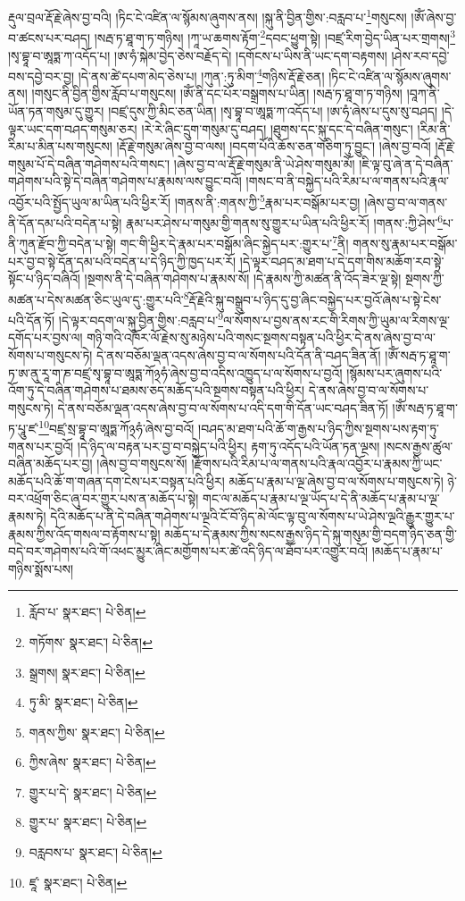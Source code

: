 རྡུལ་བྲལ་རྡོ་རྗེ་ཞེས་བྱ་བའི། །ཏིང་ངེ་འཛིན་ལ་སྙོམས་ཞུགས་ནས། །སྐུ་ནི་བྱིན་གྱིས་:བརླབ་པ་\footnote{རློབ་པ་  སྣར་ཐང་།  པེ་ཅིན། }གསུངས། །ཨོཾ་ཞེས་བྱ་བ་ཚངས་པར་བཤད། །སརྦ་ཏ་ཐཱ་ག་ཏ་གཉིས། །ཀཱ་ཡ་ཆགས་རྟོག་\footnote{གཏོགས་  སྣར་ཐང་།  པེ་ཅིན། }དབང་ཕྱུག་སྟེ། །བཛྲ་རིག་བྱེད་ཡིན་པར་གྲགས།\footnote{སྒྲགས།  སྣར་ཐང་།  པེ་ཅིན། } །སྭ་བྷཱ་བ་ཨཱཏྨ་ཀ་འདོད་པ། །ཨ་ཧཾ་སྐེམ་བྱེད་ཅེས་བརྗོད་དེ། །དགོངས་པ་ཡིས་ནི་ཡང་དག་བརྟགས། །ཤེས་རབ་དབྱེ་བས་དབྱེ་བར་བྱ། །དེ་ནས་ཚེ་དཔག་མེད་ཅེས་པ། །ཀུན་:ཏུ་མིག་\footnote{ཏུ་མི་  སྣར་ཐང་།  པེ་ཅིན། }གཉིས་རྡོ་རྗེ་ཅན། །ཏིང་ངེ་འཛིན་ལ་སྙོམས་ཞུགས་ནས། །གསུང་ནི་བྱིན་གྱིས་རློབ་པ་གསུངས། །ཨོཾ་ནི་དང་པོར་བསྒྲགས་པ་ཡིན། །སརྦ་ཏ་ཐཱ་ག་ཏ་གཉིས། །བཱཀ་ནི་ཡོན་ཏན་གསུམ་དུ་གྱུར། །བཛྲ་དུས་ཀྱི་མིང་ཅན་ཡིན། །སྭ་བྷཱ་བ་ཨཱཏྨ་ཀ་འདོད་པ། །ཨ་ཧཾ་ཞེས་པ་དུས་སུ་བཤད། །དེ་ལྟར་ཡང་དག་བཤད་གསུམ་ཅར། །རེ་རེ་ཞིང་དྲུག་གསུམ་དུ་བཤད། །ཐུགས་དང་སྐུ་དང་དེ་བཞིན་གསུང་། །རིམ་ནི་རིམ་པ་མིན་པས་གསུངས། །རྡོ་རྗེ་གསུམ་ཞེས་བྱ་བ་ལས། །བདག་པོའི་ཆོས་ཅན་གཅིག་ཏུ་བྱུང་། །ཞེས་བྱ་བའོ། །རྡོ་རྗེ་གསུམ་པོ་དེ་བཞིན་གཤེགས་པའི་གསང་། །ཞེས་བྱ་བ་ལ་རྡོ་རྗེ་གསུམ་ནི་ཡེ་ཤེས་གསུམ་མོ། །ཇི་ལྟ་བུ་ཞེ་ན་དེ་བཞིན་གཤེགས་པའི་སྟེ་དེ་བཞིན་གཤེགས་པ་རྣམས་ལས་བྱུང་བའོ། །གསང་བ་ནི་བསྐྱེད་པའི་རིམ་པ་ལ་གནས་པའི་རྣལ་འབྱོར་པའི་སྤྱོད་ཡུལ་མ་ཡིན་པའི་ཕྱིར་རོ། །གནས་ནི་:གནས་ཀྱི་\footnote{གནས་ཀྱིས་  སྣར་ཐང་།  པེ་ཅིན། }རྣམ་པར་བསྒོམ་པར་བྱ། །ཞེས་བྱ་བ་ལ་གནས་ནི་དོན་དམ་པའི་བདེན་པ་སྟེ། རྣམ་པར་ཤེས་པ་གསུམ་གྱི་གནས་སུ་གྱུར་པ་ཡིན་པའི་ཕྱིར་རོ། །གནས་:ཀྱི་ཤེས་\footnote{ཀྱིས་ཞེས་  སྣར་ཐང་།  པེ་ཅིན། }པ་ནི་ཀུན་རྫོབ་ཀྱི་བདེན་པ་སྟེ། གང་གི་ཕྱིར་དེ་རྣམ་པར་བསྒོམ་ཞིང་སྐྱེད་པར་:གྱུར་པ་\footnote{གྱུར་པ་དེ་  སྣར་ཐང་།  པེ་ཅིན། }ནི། གནས་སུ་རྣམ་པར་བསྒོམ་པར་བྱ་བ་སྟེ་དོན་དམ་པའི་བདེན་པ་དེ་ཉིད་ཀྱི་ཁྱད་པར་རོ། །དེ་ལྟར་བཤད་མ་ཐག་པ་དེ་དག་གིས་མཆོག་རབ་སྟེ་སྟོང་པ་ཉིད་བཞིའོ། །སྔགས་ནི་དེ་བཞིན་གཤེགས་པ་རྣམས་སོ། །དེ་རྣམས་ཀྱི་མཚན་ནི་འོད་ཟེར་ལྔ་སྟེ། སྔགས་ཀྱི་མཚན་པ་དེས་མཚན་ཅིང་ཡུལ་དུ་:གྱུར་པའི་\footnote{གྱུར་པ་  སྣར་ཐང་།  པེ་ཅིན། }རྡོ་རྗེའི་སྐུ་བསྒྲུབ་པ་ཉིད་དུ་བྱ་ཞིང་བསྐྱེད་པར་བྱའོ་ཞེས་པ་སྟེ་ངེས་པའི་དོན་ཏོ། །དེ་ལྟར་བདག་ལ་སྐུ་བྱིན་གྱིས་:བརླབ་པ་\footnote{བརླབས་པ་  སྣར་ཐང་།  པེ་ཅིན། }ལ་སོགས་པ་བྱས་ནས་རང་གི་རིགས་ཀྱི་ཡུམ་ལ་རིགས་ལྔ་དགོད་པར་བྱས་ལ། གཉི་གའི་འཁོར་ལོ་རྗེས་སུ་མཉེས་པའི་གསང་སྔགས་བསྟན་པའི་ཕྱིར་དེ་ནས་ཞེས་བྱ་བ་ལ་སོགས་པ་གསུངས་ཏེ། དེ་ནས་བཅོམ་ལྡན་འདས་ཞེས་བྱ་བ་ལ་སོགས་པའི་དོན་ནི་བཤད་ཟིན་ནོ། །ཨོཾ་སརྦ་ཏ་ཐཱ་ག་ཏ་ཨ་ནུ་རཱ་ག་ཎ་བཛྲ་སྭ་བྷཱ་བ་ཨཱཏྨ་ཀོ྅ཧཾ་ཞེས་བྱ་བ་འདིས་འཁྱུད་པ་ལ་སོགས་པ་བྱའོ། །སྙོམས་པར་ཞུགས་པའི་འོག་ཏུ་དེ་བཞིན་གཤེགས་པ་ཐམས་ཅད་མཆོད་པའི་སྔགས་བསྟན་པའི་ཕྱིར། དེ་ནས་ཞེས་བྱ་བ་ལ་སོགས་པ་གསུངས་ཏེ། དེ་ནས་བཅོམ་ལྡན་འདས་ཞེས་བྱ་བ་ལ་སོགས་པ་འདི་དག་གི་དོན་ཡང་བཤད་ཟིན་ཏོ། །ཨོཾ་སརྦ་ཏ་ཐཱ་ག་ཏ་པཱུ་ཛ་\footnote{ཛཱ་  སྣར་ཐང་།  པེ་ཅིན། }བཛྲ་སྲ་བྷཱ་བ་ཨཱཏྨ་ཀོ྅ཧཾ་ཞེས་བྱ་བའོ། །བཤད་མ་ཐག་པའི་ཆོ་ག་རྒྱས་པ་ཉིད་ཀྱིས་སྔགས་པས་རྟག་ཏུ་གནས་པར་བྱའོ། །དེ་ཉིད་ལ་བརྟན་པར་བྱ་བ་བསྐྱེད་པའི་ཕྱིར། རྟག་ཏུ་འདོད་པའི་ཡོན་ཏན་ལྔས། །སངས་རྒྱས་ཚུལ་བཞིན་མཆོད་པར་བྱ། །ཞེས་བྱ་བ་གསུངས་སོ། །རྫོགས་པའི་རིམ་པ་ལ་གནས་པའི་རྣལ་འབྱོར་པ་རྣམས་ཀྱི་ཡང་མཆོད་པའི་ཆོ་ག་གཞན་དག་ངེས་པར་བསྟན་པའི་ཕྱིར། མཆོད་པ་རྣམ་པ་ལྔ་ཞེས་བྱ་བ་ལ་སོགས་པ་གསུངས་ཏེ། ཉེ་བར་འཕྲོག་ཅིང་ཞུ་བར་གྱུར་པས་ན་མཆོད་པ་སྟེ། གང་ལ་མཆོད་པ་རྣམ་པ་ལྔ་ཡོད་པ་དེ་ནི་མཆོད་པ་རྣམ་པ་ལྔ་རྣམས་ཏེ། དེའི་མཆོད་པ་ནི་དེ་བཞིན་གཤེགས་པ་ལྔའི་ངོ་བོ་ཉིད་མེ་ལོང་ལྟ་བུ་ལ་སོགས་པ་ཡེ་ཤེས་ལྔའི་རྒྱུར་གྱུར་པ་རྣམས་ཀྱིས་འོད་གསལ་བ་རྟོགས་པ་སྟེ། མཆོད་པ་དེ་རྣམས་ཀྱིས་སངས་རྒྱས་ཉིད་དེ་སྐུ་གསུམ་གྱི་བདག་ཉིད་ཅན་གྱི་བདེ་བར་གཤེགས་པའི་གོ་འཕང་མྱུར་ཞིང་མགྱོགས་པར་ཚེ་འདི་ཉིད་ལ་ཐོབ་པར་འགྱུར་བའོ། །མཆོད་པ་རྣམ་པ་གཉིས་སྨོས་པས། 